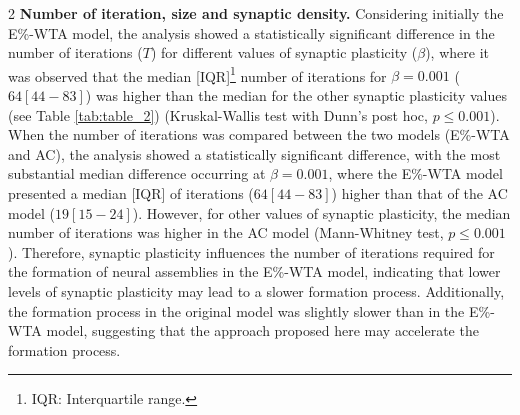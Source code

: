 \documentclass[a4paper, 10pt]{article}
\begin{document}
\begin{multicols}{2}
\noindent\textbf{Number of iteration, size and synaptic density.} Considering initially the E\%-WTA model, the analysis showed a statistically significant difference in the number of iterations ($T$) for different values of synaptic plasticity ($\beta$), where it was observed that the median [IQR]\footnote{IQR: Interquartile range.} number of iterations for $\beta = 0.001$ ($64 \left[44 - 83\right]$) was higher than the median for the other synaptic plasticity values (see Table \ref{tab:table_2}) (Kruskal-Wallis test with Dunn’s post hoc, $p \leq 0.001$). When the number of iterations was compared between the two models (E\%-WTA and AC), the analysis showed a statistically significant difference, with the most substantial median difference occurring at $\beta = 0.001$, where the E\%-WTA model presented a median [IQR] of iterations ($64\left[44-83\right]$) higher than that of the AC model ($19\left[15-24\right]$). However, for other values of synaptic plasticity, the median number of iterations was higher in the AC model (Mann-Whitney test, $p \leq 0.001$). Therefore, synaptic plasticity influences the number of iterations required for the formation of neural assemblies in the E\%-WTA model, indicating that lower levels of synaptic plasticity may lead to a slower formation process. Additionally, the formation process in the original model was slightly slower than in the E\%-WTA model, suggesting that the approach proposed here may accelerate the formation process. 


\end{multicols}
\end{document}

